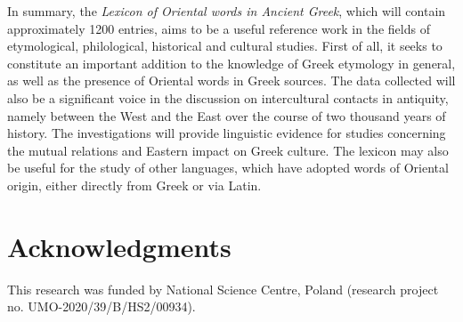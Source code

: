 \documentclass[output=paper,colorlinks,citecolor=brown,arabicfont,chinesefont]{langscibook}
\begin{document}
In summary, the \emph{Lexicon of Oriental words in Ancient Greek}, which will contain approximately 1200 entries, aims to be a useful reference work in the fields of etymological, philological, historical and cultural studies. First of all, it seeks to constitute an important addition to the knowledge of Greek etymology in general, as well as the presence of Oriental words in Greek sources. The data collected will also be a significant voice in the discussion on intercultural contacts in antiquity, namely between the West and the East over the course of two thousand years of history. The investigations will provide linguistic evidence for studies concerning the mutual relations and Eastern impact on Greek culture. The lexicon may also be useful for the study of other languages, which have adopted words of Oriental origin, either directly from Greek or via Latin.

\section*{Acknowledgments}

This research was funded by National Science Centre, Poland (research project no. UMO-2020/39/B/HS2/00934).

{\sloppy\printbibliography[heading=subbibliography,notkeyword=this]}
\end{document}
